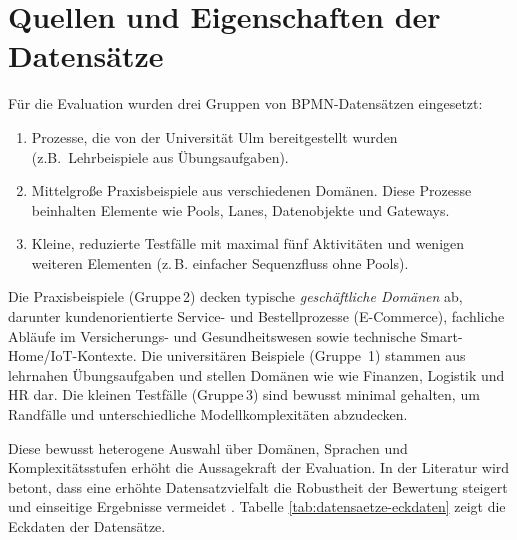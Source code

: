 \section{Quellen und Eigenschaften der Datensätze}\label{sec:quellen-und-eigenschaften-der-datensatze}

Für die Evaluation wurden drei Gruppen von \ac{BPMN}-Datensätzen eingesetzt:

\begin{enumerate}
    \item Prozesse, die von der Universität Ulm bereitgestellt wurden (z.B.\ Lehrbeispiele aus Übungsaufgaben).
    \item Mittelgroße Praxisbeispiele aus verschiedenen Domänen. Diese Prozesse beinhalten Elemente wie Pools, Lanes, Datenobjekte und Gateways.
    \item Kleine, reduzierte Testfälle mit maximal fünf Aktivitäten und wenigen weiteren Elementen (z.\,B. einfacher Sequenzfluss ohne Pools).
\end{enumerate}

Die Praxisbeispiele (Gruppe\,2) decken typische \emph{geschäftliche Domänen} ab, darunter kundenorientierte Service- und Bestellprozesse (E-Commerce), fachliche Abläufe im Versicherungs- und Gesundheitswesen sowie technische Smart-Home/IoT-Kontexte. Die universitären Beispiele (Gruppe~1) stammen aus lehrnahen Übungsaufgaben und stellen Domänen wie wie Finanzen, Logistik und HR dar. Die kleinen Testfälle (Gruppe\,3) sind bewusst minimal gehalten, um Randfälle und unterschiedliche Modellkomplexitäten abzudecken.

Diese bewusst heterogene Auswahl über Domänen, Sprachen und Komplexitätsstufen erhöht die Aussagekraft der Evaluation. In der Literatur wird betont, dass eine erhöhte Datensatzvielfalt die Robustheit der Bewertung steigert und einseitige Ergebnisse vermeidet \cite{blake2025datasetdiversity}. Tabelle \ref{tab:datensaetze-eckdaten} zeigt die Eckdaten der Datensätze.


